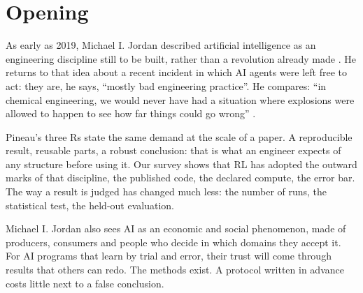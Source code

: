 \section{Opening}\label{sec:ouverture}
As early as 2019, Michael I. Jordan described artificial intelligence as an engineering discipline
still to be built, rather than a revolution already made \parencite{mijordan2019revolution,mijordan2019drai}.
He returns to that idea about a recent incident in which AI agents were left free to act: they are,
he says, \enquote{mostly bad engineering practice}. He compares: \enquote{in chemical engineering,
we would never have had a situation where explosions were allowed to happen to see how far things
could go wrong}
\parencite[our translation from the French]{mijordan2026liberation}.

Pineau's three Rs state the same demand at the scale of a paper. A reproducible result, reusable
parts, a robust conclusion: that is what an engineer expects of any structure before using it. Our
survey shows that RL has adopted the outward marks of that discipline, the published code, the
declared compute, the error bar. The way a result is judged has changed much less: the number of
runs, the statistical test, the held-out evaluation.

Michael I. Jordan also sees AI as an economic and social phenomenon, made of producers, consumers and
people who decide in which domains they accept it. For AI programs that learn by trial and error,
their trust will come through results that others can redo. The methods exist. A protocol written in
advance costs little next to a false conclusion.
